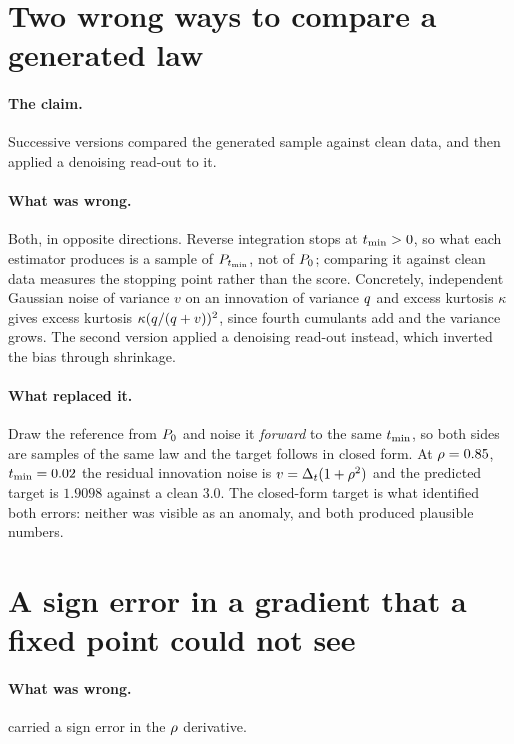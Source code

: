 \section{Two wrong ways to compare a generated law}
\label{sec:corr-generation}

\paragraph{The claim.} Successive versions compared the generated sample against clean data, and
then applied a denoising read-out to it.

\paragraph{What was wrong.} Both, in opposite directions. Reverse integration stops at
$t_{\min}>0$, so what each estimator produces is a sample of $P_{t_{\min}}$, not of $P_0$; comparing it
against clean data measures the stopping point rather than the score. Concretely, independent
Gaussian noise of variance $v$ on an innovation of variance $q$ and excess kurtosis $\kappa$
gives excess kurtosis $\kappa(q/(q+v))^2$, since fourth cumulants add and the variance
grows. The second version applied a denoising read-out instead, which inverted the bias through
shrinkage.

\paragraph{What replaced it.} Draw the reference from $P_0$ and noise it \emph{forward} to the
same $t_{\min}$, so both sides are samples of the same law and the target follows in closed form. At
$\rho=0.85$, $t_{\min}=0.02$ the residual innovation noise is $v=\Delta_t(1+\rho^2)$ and the predicted
target is $1.9098$ against a clean $3.0$. The closed-form target is what identified both errors:
neither was visible as an anomaly, and both produced plausible numbers.

\section{A sign error in a gradient that a fixed point could not see}
\label{sec:corr-gradient}

\paragraph{What was wrong.} 
carried a sign error in the $\rho$ derivative.


